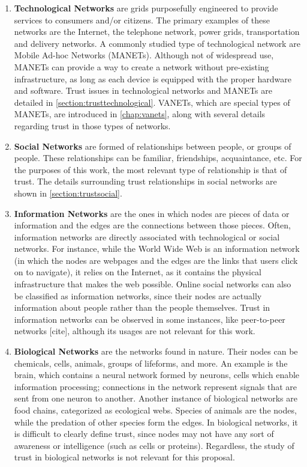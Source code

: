 \begin{enumerate}
	\item \textbf{Technological Networks} are grids purposefully engineered to provide services to consumers and/or citizens.
	 	The primary examples of these networks are the Internet, the telephone network, power grids, transportation and delivery networks.
	 	A commonly studied type of technological network are Mobile Ad-hoc Networks (MANETs).
		Although not of widespread use, MANETs can provide a way to create a network without pre-existing infrastructure, as long as each device is equipped with the proper hardware and software.
		Trust issues in technological networks and MANETs are detailed in \autoref{section:trusttechnological}.
		VANETs, which are special types of MANETs, are introduced in \autoref{chap:vanets}, along with several details regarding trust in those types of networks.
	\item \textbf{Social Networks} are formed of relationships between people, or groups of people.
		These relationships can be familiar, friendships, acquaintance, etc.
		For the purposes of this work, the most relevant type of relationship is that of trust.
		The details surrounding trust relationships in social networks are shown in \autoref{section:trustsocial}.
	\item \textbf{Information Networks} are the ones in which nodes are pieces of data or information and the edges are the connections between those pieces.
		Often, information networks are directly associated with technological or social networks.
		For instance, while the World Wide Web is an information network (in which the nodes are webpages and the edges are the links that users click on to navigate), it relies on the Internet, as it contains the physical infrastructure that makes the web possible.
		Online social networks can also be classified as information networks, since their nodes are actually information about people rather than the people themselves.
		Trust in information networks can be observed in some instances, like peer-to-peer networks [cite], although its usages are not relevant for this work.
	\item \textbf{Biological Networks} are the networks found in nature.
		Their nodes can be chemicals, cells, animals, groups of lifeforms, and more.
		An example is the brain, which contains a neural network formed by neurons, cells which enable information processing; connections in the network represent signals that are sent from one neuron to another.
		Another instance of biological networks are food chains, categorized as ecological webs.
		Species of animals are the nodes, while the predation of other species form the edges.
		In biological networks, it is difficult to clearly define trust, since nodes may not have any sort of awareness or intelligence (such as cells or proteins).
		Regardless, the study of trust in biological networks is not relevant for this proposal.
		
\end{enumerate}

